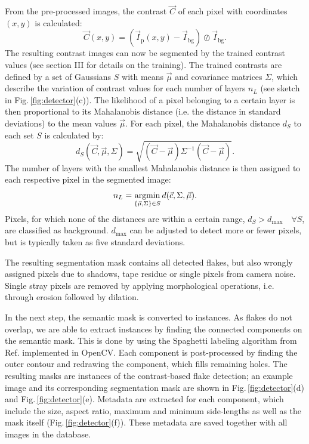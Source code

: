 \documentclass[reprint, prl, superscriptaddress, floatfix]{revtex4-2}
\newcommand{\fig}[1]{Fig.\,\ref{#1}}
\begin{document}
From the pre-processed images, the contrast $\vec{C}$ of each pixel with coordinates $(x,y)$ is calculated:
\begin{equation}
    \Vec{C}(x,y) = (\vec{I}_{\mathrm{p}}(x,y) - \vec{I}_{\mathrm{bg}}) \oslash \vec{I}_{\mathrm{bg}}.
    \label{eq:contrast}
\end{equation}
The resulting contrast images can now be segmented by the trained contrast values (see section III for details on the training). 
The trained contrasts are defined by a set of Gaussians $S$ with means $\Vec{\mu}$ and covariance matrices $\Sigma$, which describe the variation of contrast values for each number of layers $n_L$ (see sketch in \fig{fig:detector}(c)).
The likelihood of a pixel belonging to a certain layer is then proportional to its Mahalanobis distance (i.e. the distance in standard deviations) to the mean values $\Vec{\mu}$.
For each pixel, the Mahalanobis distance $d_S$ to each set $S$ is calculated by:
\begin{equation}
    d_{S}(\Vec{C}, \Vec{\mu}, \Sigma) = \sqrt{(\Vec{C}-\Vec{\mu})\Sigma^{-1}(\Vec{C}-\Vec{\mu})}.
\end{equation}
The number of layers with the smallest Mahalanobis distance is then assigned to each respective pixel in the segmented image:
\begin{equation}
    n_L = \operatornamewithlimits{argmin}_{\{\Vec{\mu}, \Sigma\} \in S}d(\Vec{c},\Sigma, \Vec{\mu}).
\end{equation} 
Pixels, for which none of the distances are within a certain range, $d_S > d_{\mathrm{max}} \quad \forall S$, are classified as background. 
$d_{\mathrm{max}}$ can be adjusted to detect more or fewer pixels, but is typically taken as five standard deviations.

The resulting segmentation mask contains all detected flakes, but also wrongly assigned pixels due to shadows, tape residue or single pixels from camera noise.
Single stray pixels are removed by applying morphological operations, i.e. through erosion followed by dilation.

In the next step, the semantic mask is converted to instances.
As flakes do not overlap, we are able to extract instances by finding the connected components on the semantic mask.
This is done by using the Spaghetti labeling algorithm from Ref. \cite{Bolelli} implemented in OpenCV. 
Each component is post-processed by finding the outer contour and redrawing the component, which fills remaining holes.
The resulting masks are instances of the contrast-based flake detection; an example image and its corresponding segmentation mask are shown in \fig{fig:detector}(d) and \fig{fig:detector}(e).
Metadata are extracted for each component, which include the size, aspect ratio, maximum and minimum side-lengths as well as the mask itself (\fig{fig:detector}(f)). 
These metadata are saved together with all images in the database. 
\end{document}
